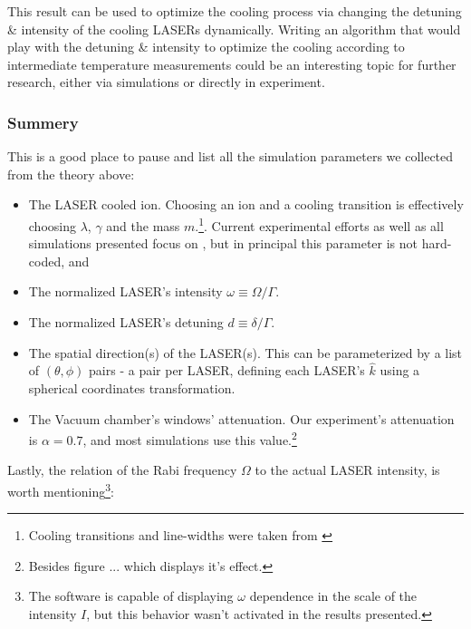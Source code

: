 This result can be used to optimize the cooling process via changing the detuning \& intensity of the cooling LASERs dynamically. Writing an algorithm that would play with the detuning \& intensity to optimize the cooling according to intermediate temperature measurements could be an interesting topic for further research, either via simulations or directly in experiment.

\subsubsection{Summery}

This is a good place to pause and list all the simulation parameters we collected from the theory above:

\begin{itemize}
	\item The LASER cooled ion. Choosing an ion and a cooling transition is effectively choosing $\lambda$, $\gamma$ and the mass $m$.\footnote{Cooling transitions and line-widths were taken from \cite{CoolingBeParameters,CoolingCaParameters1,CoolingCaParameters2,RansfordThesis,RadiumData}}. Current experimental efforts as well as all simulations presented focus on , but in principal this parameter is not hard-coded, and 
	\item The normalized LASER's intensity $\omega \equiv \Omega/\Gamma$.
	\item The normalized LASER's detuning $d \equiv \delta/\Gamma$.
	\item The spatial direction(s) of the LASER(s). This can be parameterized by a list of $(\theta, \phi)$ pairs - a pair per LASER, defining each LASER's $\hat{k}$ using a spherical coordinates transformation.
	\item The Vacuum chamber's windows' attenuation. Our experiment's attenuation is $\alpha = 0.7$, and most simulations use this value.\footnote{Besides figure ... which displays it's effect.}
\end{itemize}

Lastly, the relation of the Rabi frequency $\Omega$ to the actual LASER intensity\cite{CJFootOmega2I}, is worth mentioning\footnote{The software is capable of displaying $\omega$ dependence in the scale of the intensity $I$, but this behavior wasn't activated in the results presented.}:


